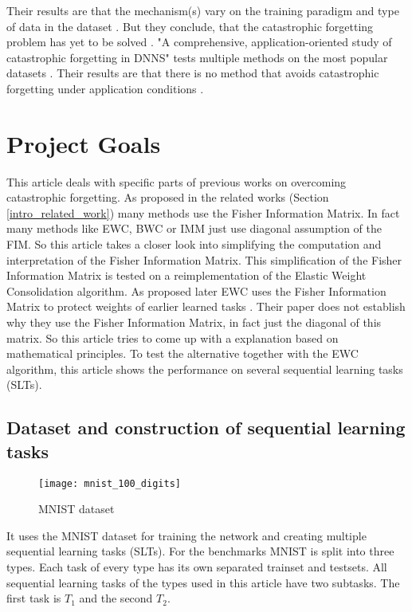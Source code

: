 Their results are that the mechanism(s) vary on the training paradigm and type of data in the dataset \cite{measuring_cf_in_nns}.
But they conclude, that the catastrophic forgetting problem has yet to be solved \cite{measuring_cf_in_nns}.
\newline
"A comprehensive, application-oriented study of catastrophic forgetting in DNNS" \cite{cf_application_oriented_study} tests multiple methods on the most popular datasets \cite{cf_application_oriented_study}.
Their results are that there is no method that avoids catastrophic forgetting under application conditions \cite{cf_application_oriented_study}.

\section{Project Goals}
\label{project_goals}

This article deals with specific parts of previous works on overcoming catastrophic forgetting.
As proposed in the related works (Section \ref{intro_related_work}) many methods use the Fisher Information Matrix.
In fact many methods like EWC, BWC or IMM just use diagonal assumption of the FIM.
So this article takes a closer look into simplifying the computation and interpretation of the Fisher Information Matrix.
This simplification of the Fisher Information Matrix is tested on a reimplementation of the Elastic Weight Consolidation algorithm.
As proposed later EWC uses the Fisher Information Matrix to protect weights of earlier learned tasks \cite{elastic-weight-consolidation}.
Their paper does not establish why they use the Fisher Information Matrix, in fact just the diagonal of this matrix.
So this article tries to come up with a explanation based on mathematical principles.
To test the alternative together with the EWC algorithm, this article shows the performance on several sequential learning tasks (SLTs).

\subsection*{Dataset and construction of sequential learning tasks}

\begin{figure}[H]
    \centering
    \texttt{[image: mnist\_100\_digits]}
    \caption{\cite{mnist_examples_image} MNIST dataset}
    \label{fig:intro_mnist_examples}
\end{figure}

It uses the MNIST dataset for training the network and creating multiple sequential learning tasks (SLTs).
For the benchmarks MNIST is split into three types.
Each task of every type has its own separated trainset and testsets.
All sequential learning tasks of the types used in this article have two subtasks.
The first task is $T_1$ and the second $T_2$.

